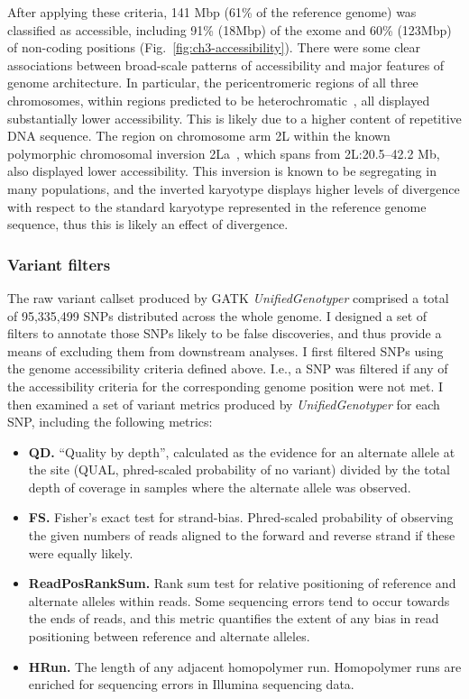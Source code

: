\begin{refsection}
After applying these criteria, 141 Mbp (61\% of the reference genome) was classified as accessible, including 91\% (18Mbp) of the exome and 60\% (123Mbp) of non-coding positions (Fig.~\ref{fig:ch3-accessibility}).
%
There were some clear associations between broad-scale patterns of accessibility and major features of genome architecture.
%
In particular, the pericentromeric regions of all three chromosomes, within regions predicted to be heterochromatic~\parencite{Sharakhova2010}, all displayed substantially lower accessibility.
%
This is likely due to a higher content of repetitive DNA sequence.
%
The region on chromosome arm 2L within the known polymorphic chromosomal inversion 2La~\parencite{Coluzzi2002}, which spans from 2L:20.5--42.2 Mb, also displayed lower accessibility.
%
This inversion is known to be segregating in many populations, and the inverted karyotype displays higher levels of divergence with respect to the standard karyotype represented in the reference genome sequence, thus this is likely an effect of divergence.


\subsubsection{Variant filters}


The raw variant callset produced by GATK \textit{UnifiedGenotyper} comprised a total of 95,335,499 SNPs distributed across the whole genome.
%
I designed a set of filters to annotate those SNPs likely to be false discoveries, and thus provide a means of excluding them from downstream analyses.
%
I first filtered SNPs using the genome accessibility criteria defined above.
%
I.e., a SNP was filtered if any of the accessibility criteria for the corresponding genome position were not met.
%
I then examined a set of variant metrics produced by \textit{UnifiedGenotyper} for each SNP, including the following metrics:
%
\begin{itemize}
%
\item \textbf{QD.} ``Quality by depth'', calculated as the evidence for an alternate allele at the site (QUAL, phred-scaled probability of no variant) divided by the total depth of coverage in samples where the alternate allele was observed.
%
\item \textbf{FS.} Fisher's exact test for strand-bias.
%
Phred-scaled probability of observing the given numbers of reads aligned to the forward and reverse strand if these were equally likely.
%
\item \textbf{ReadPosRankSum.} Rank sum test for relative positioning of reference and alternate alleles within reads.
%
Some sequencing errors tend to occur towards the ends of reads, and this metric quantifies the extent of any bias in read positioning between reference and alternate alleles.
%
\item \textbf{HRun.} The length of any adjacent homopolymer run.
%
Homopolymer runs are enriched for sequencing errors in Illumina sequencing data.
%
\end{itemize}



\end{refsection}

